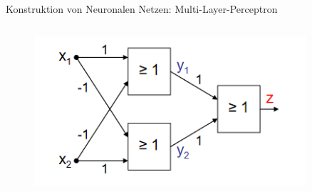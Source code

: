 \documentclass[aspectratio=1610, xcolor=dvipsnames, 9pt]{beamer}
\begin{document}
\begin{frame}{Konstruktion von Neuronalen Netzen: Multi-Layer-Perceptron}
\begin{columns}
\begin{column}{0.3\textwidth}
\begin{figure}
              \end{figure}
       \begin{figure}
       \centering
                   \includegraphics[width=0.9\textwidth]{images/XOR.png}
       \end{figure}
          \end{column}
        \end{columns}
      \end{frame}
\end{document}
